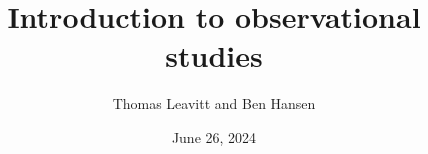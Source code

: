 \documentclass[table, xcolor = {dvipsnames}, 9pt]{beamer}
\title[]{Introduction to observational studies} %
\author{Thomas Leavitt and Ben Hansen}
\institute[]
{

}
\date{June 26, 2024}
\theoremstyle{plain}
\begin{document}
\begin{frame}
\titlepage %
\end{frame}


\end{document}
